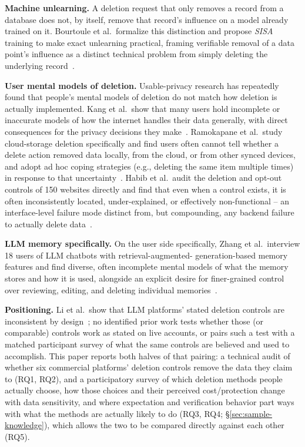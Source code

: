 \documentclass[conference,compsoc]{IEEEtran}
\begin{document}
\textbf{Machine unlearning.} A deletion request that only removes a
record from a database does not, by itself, remove that record's
influence on a model already trained on it. Bourtoule et al.\ formalize
this distinction and propose \textit{SISA} training to make exact
unlearning practical, framing verifiable removal of a data point's
influence as a distinct technical problem from simply deleting the
underlying record~\cite{bourtoule2021machine}.

\textbf{User mental models of deletion.} Usable-privacy research has
repeatedly found that people's mental models of deletion do not
match how deletion is actually implemented. Kang et al.\ show that many
users hold incomplete or inaccurate models of how the internet handles
their data generally, with direct consequences for the privacy decisions
they make~\cite{kang2015mydata}. Ramokapane et al.\ study cloud-storage
deletion specifically and find users often cannot tell whether a delete
action removed data locally, from the cloud, or from other synced
devices, and adopt ad hoc coping strategies (e.g., deleting the same
item multiple times) in response to that uncertainty~\cite{ramokapane2017stupid}.
Habib et al.\ audit the deletion and opt-out controls of 150 websites
directly and find that even when a control exists, it is often
inconsistently located, under-explained, or effectively non-functional --
an interface-level failure mode distinct from, but compounding, any
backend failure to actually delete data~\cite{habib2019empirical}.

\textbf{LLM memory specifically.} On the user side specifically, Zhang
et al.\ interview 18 users of LLM chatbots with retrieval-augmented-
generation-based memory features and find diverse, often incomplete
mental models of what the memory stores and how it is used, alongside an
explicit desire for finer-grained control over reviewing, editing, and
deleting individual memories~\cite{zhang2025understanding}.

\textbf{Positioning.} Li et al.\ show that LLM platforms' stated
deletion controls are inconsistent by design~\cite{li2026privacy}; no
identified prior work tests whether those (or comparable) controls
work as stated on live accounts, or pairs such a test with a matched
participant survey of what the same controls are believed and used to
accomplish. This paper reports both halves of that pairing: a technical
audit of whether six commercial platforms' deletion controls remove the
data they claim to (RQ1, RQ2), and a participatory survey of which
deletion methods people actually choose, how those choices and their
perceived cost/protection change with data sensitivity, and where
expectation and verification behavior part ways with what the methods
are actually likely to do (RQ3, RQ4;
\S\ref{sec:sample-knowledge}), which allows the two to be compared directly
against each other (RQ5).
\end{document}
